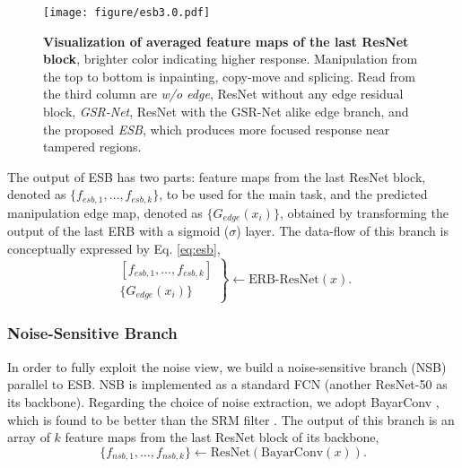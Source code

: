 \begin{figure}[htpb]
    \begin{center}
    \texttt{[image: figure/esb3.0.pdf]}
    \end{center}
    \caption{\textbf{Visualization of averaged feature maps of the last ResNet block}, brighter color indicating  higher response.  Manipulation from the top to bottom is inpainting, copy-move and splicing. Read from the third column  are \textit{w/o edge}, \ie ResNet without any edge residual block, \textit{GSR-Net}, \ie ResNet with the GSR-Net alike edge branch, and the proposed \textit{ESB}, which produces  more focused response near tampered regions.}
    \label{fig:visual_esb}
\end{figure}








The output of ESB has two parts: feature maps from the last ResNet block, denoted as $\{f_{esb,1}, \ldots, f_{esb,k}\}$, to be used for the main task, and the predicted manipulation edge map, denoted as $\{G_{edge}(x_{i})\}$, obtained by transforming the output of the last ERB with a sigmoid ($\sigma$) layer. The data-flow of this branch is conceptually expressed by Eq. \ref{eq:esb},
\begin{equation}\label{eq:esb}
\left. {\begin{array}{*{20}{r}}
{\left[ {{f_{esb,1}}, \!\ldots ,{f_{esb,k}}} \right]}\\
\{G_{edge}\left( {{x_{i}}} \right)\}
\end{array}} \right\} \!\leftarrow \!\mbox{ERB-ResNet}(x).
\end{equation}





\subsubsection{Noise-Sensitive Branch }\label{sssec:nsb}



In order to fully exploit the noise view, we build a noise-sensitive branch (NSB) parallel to ESB. NSB is implemented as a standard FCN (another ResNet-50 as its backbone). Regarding the choice of noise extraction, we adopt BayarConv \cite{Bayar-journal}, which is found to be better than the SRM filter \cite{2020Constrained}. The output of this branch is an array of $k$ feature maps from the last ResNet block of its backbone, \ie
\begin{equation} \label{eq:nsb}
\{f_{nsb,1}, \ldots, f_{nsb,k}\} \leftarrow \mbox{ResNet}(\mbox{BayarConv}(x)).
\end{equation}







